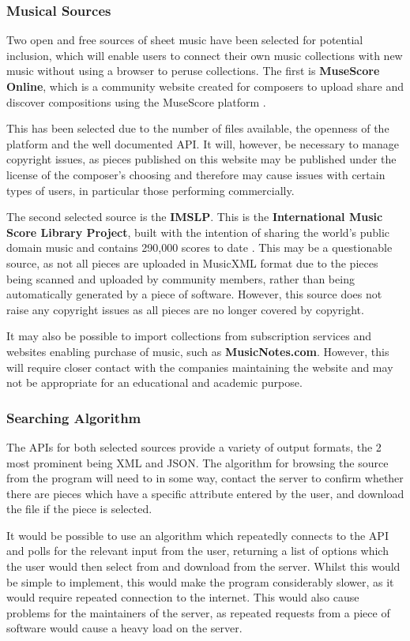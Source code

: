 \subsubsection{Musical Sources}
Two open and free sources of sheet music have been selected for potential inclusion, which will enable users to connect their own music collections with new music without using a browser to peruse collections. The first is \textbf{MuseScore Online}, which is a community website created for composers to upload share and discover compositions using the MuseScore platform \parencite{MuseShare}.

This has been selected due to the number of files available, the openness of the platform and the well documented API. It will, however, be necessary to manage copyright issues, as pieces published on this website may be published under the license of the composer's choosing and therefore may cause issues with certain types of users, in particular those performing commercially.

The second selected source is the \textbf{IMSLP}. This is the \textbf{International Music Score Library Project}, built with the intention of sharing the world’s public domain music and contains 290,000 scores to date \parencite{imslp}. This may be a questionable source, as not all pieces are uploaded in MusicXML format due to the pieces being scanned and uploaded by community members, rather than being automatically generated by a piece of software. However, this source does not raise any copyright issues as all pieces are no longer covered by copyright.

It may also be possible to import collections from subscription services and websites enabling purchase of music, such as \textbf{MusicNotes.com}. However, this will require closer contact with the companies maintaining the website and may not be appropriate for an educational and academic purpose.

\subsubsection{Searching Algorithm}
The APIs for both selected sources provide a variety of output formats, the 2 most prominent being XML and JSON. The algorithm for browsing the source from the program will need to in some way, contact the server to confirm whether there are pieces which have a specific attribute entered by the user, and download the file if the piece is selected.

It would be possible to use an algorithm which repeatedly connects to the API and polls for the relevant input from the user, returning a list of options which the user would then select from and download from the server. Whilst this would be simple to implement, this would make the program considerably slower, as it would require repeated connection to the internet. This would also cause problems for the maintainers of the server, as repeated requests from a piece of software would cause a heavy load on the server.

